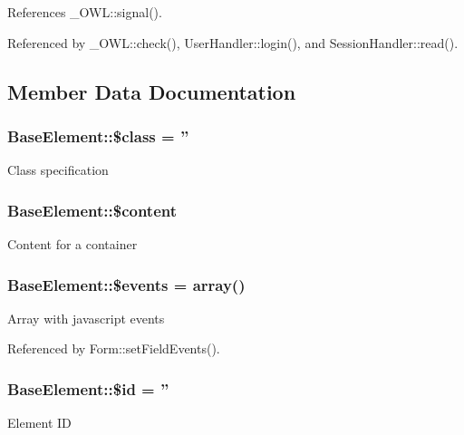 References \_\-OWL::signal().



Referenced by \_\-OWL::check(), UserHandler::login(), and SessionHandler::read().



\subsection{Member Data Documentation}
\subsubsection[{\$class}]{\setlength{\rightskip}{0pt plus 5cm}BaseElement::\$class = ''}\label{classBaseElement_a99976a8e967db92e7800309f359b0803}
Class specification 
\subsubsection[{\$content}]{\setlength{\rightskip}{0pt plus 5cm}BaseElement::\$content}\label{classBaseElement_ac2c7999af8528ffd86f3f1864028948a}
Content for a container 
\subsubsection[{\$events}]{\setlength{\rightskip}{0pt plus 5cm}BaseElement::\$events = array()}\label{classBaseElement_a02cebe45d277b4ff8f29db08bad371ba}
Array with javascript events 

Referenced by Form::setFieldEvents().

\subsubsection[{\$id}]{\setlength{\rightskip}{0pt plus 5cm}BaseElement::\$id = ''}\label{classBaseElement_a11b6989c43b53869a09f5ce65aa55b45}
Element ID 
